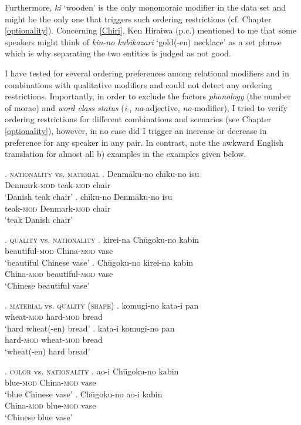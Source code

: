 \documentclass [output=book,colorlinks,citecolor=brown]{langscibook}
\begin{document}
Furthermore, \textit{ki} `wooden’ is the only monomoraic modifier in the data set and might be the only one that triggers such ordering restrictions (cf. Chapter \ref{optionality}). Concerning \ref{Chiri}, Ken Hiraiwa (p.c.) mentioned to me that some speakers might think of \textit{kin-no kubikazari} `gold(-en) necklace' as a set phrase which is why separating the two entities is judged as not good.

I have tested for several ordering preferences among relational modifiers and in combinations with qualitative modifiers and could not detect any ordering restrictions. Importantly, in order to exclude the factors \textit{phonology} (the number of morae) and \textit{word class status} (\textit{i}-, \textit{na}-adjective, \textit{no}-modifier), I tried to verify ordering restrictions for different combinations and scenarios (see Chapter \ref{optionality}), however, in no case did I trigger an increase or decrease in preference for any speaker in any pair. In contrast, note the awkward English translation for almost all b) examples in the examples given below.


\ex. \textsc{nationality} vs. \textsc{material}
\ag. Denmāku-no chīku-no isu\\
Denmark-\textsc{mod} teak-\textsc{mod} chair\\
`Danish teak chair'
\bg. chīku-no Denmāku-no isu\\
teak-\textsc{mod} Denmark-\textsc{mod} chair\\
`teak Danish chair'

\ex. \textsc{quality} vs. \textsc{nationality}
\ag. kirei-na Chūgoku-no kabin\\
beautiful-\textsc{mod} China-\textsc{mod} vase\\
`beautiful Chinese vase'
\bg. Chūgoku-no kirei-na kabin\\
China-\textsc{mod} beautiful-\textsc{mod} vase\\
`Chinese beautiful vase'

\ex. \textsc{material} vs. \textsc{quality} (\textsc{shape})
\ag. komugi-no kata-i pan\\
wheat-\textsc{mod} hard-\textsc{mod} bread\\
`hard wheat(-en) bread'
\bg. kata-i komugi-no pan\\
hard-\textsc{mod} wheat-\textsc{mod} bread\\
`wheat(-en) hard bread'

\ex. \textsc{color} vs. \textsc{nationality}
\ag. ao-i Chūgoku-no kabin\\
blue-\textsc{mod} China-\textsc{mod} vase\\
`blue Chinese vase'
\bg. Chūgoku-no ao-i kabin\\
China-\textsc{mod} blue-\textsc{mod} vase\\
`Chinese blue vase'
\end{document}
